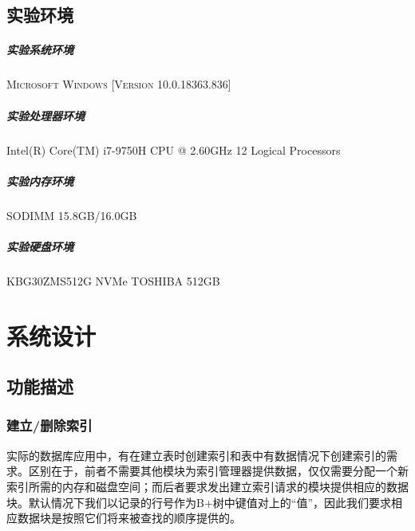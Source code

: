 \documentclass[UTF8]{ctexrep} %
\begin{document}
\section{实验环境}
\paragraph{实验系统环境} \textsc{Microsoft Windows [Version 10.0.18363.836]}
\paragraph{实验处理器环境} Intel(R) Core(TM) i7-9750H CPU @ 2.60GHz 12 Logical Processors
\paragraph{实验内存环境} SODIMM 15.8GB/16.0GB
\paragraph{实验硬盘环境} KBG30ZMS512G NVMe TOSHIBA 512GB

\chapter{系统设计}
\section{功能描述}
\subsection{建立/删除索引}
实际的数据库应用中，有在建立表时创建索引和表中有数据情况下创建索引的需求。区别在于，前者不需要其他模块为索引管理器提供数据，仅仅需要分配一个新索引所需的内存和磁盘空间；而后者要求发出建立索引请求的模块提供相应的数据块。默认情况下我们以记录的行号作为B+树中键值对上的“值”，因此我们要求相应数据块是按照它们将来被查找的顺序提供的。
\end{document}

